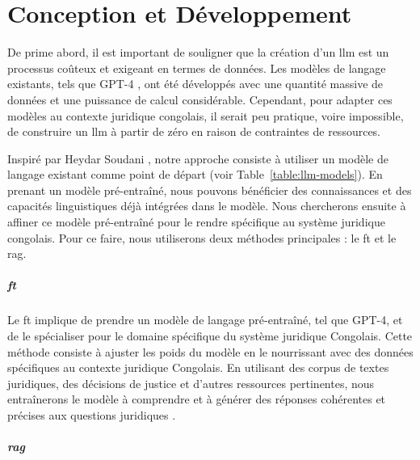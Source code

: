 
\chapter{Conception et Développement} %

\label{ch:2} %

De prime abord, il est important de souligner que la création d'un \ac{llm} est un processus coûteux et exigeant en termes de données. Les modèles de langage existants, tels que GPT-4 \cite{openai2023gpt4}, ont été développés avec une quantité massive de données et une puissance de calcul considérable. Cependant, pour adapter ces modèles au contexte juridique congolais, il serait peu pratique, voire impossible, de construire un \ac{llm} à partir de zéro en raison de contraintes de ressources.

Inspiré par Heydar Soudani \cite{soudani2024fine}, notre approche consiste à utiliser un modèle de langage existant comme point de départ (voir Table~\ref{table:llm-models}). En prenant un modèle pré-entraîné, nous pouvons bénéficier des connaissances et des capacités linguistiques déjà intégrées dans le modèle. Nous chercherons ensuite à affiner ce modèle pré-entraîné pour le rendre spécifique au système juridique congolais. Pour ce faire, nous utiliserons deux méthodes principales : le \ac{ft} et le \ac{rag}.

\paragraph{\acf{ft}} \hspace{0pt}

Le \ac{ft} implique de prendre un modèle de langage pré-entraîné, tel que GPT-4, et de le spécialiser pour le domaine spécifique du système juridique Congolais. Cette méthode consiste à ajuster les poids du modèle en le nourrissant avec des données spécifiques au contexte juridique Congolais. En utilisant des corpus de textes juridiques, des décisions de justice et d'autres ressources pertinentes, nous entraînerons le modèle à comprendre et à générer des réponses cohérentes et précises aux questions juridiques \cite{yue2023disclawllm}.

\paragraph{\acf{rag}} \hspace{0pt}

